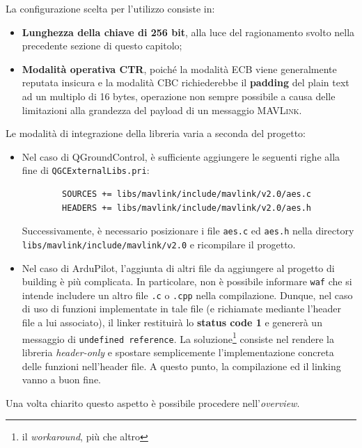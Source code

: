 \documentclass[a4paper, 12pt, oneside]{article}
\theoremstyle{definition}
\begin{document}
La configurazione scelta per l'utilizzo consiste in:

\begin{itemize}
    \item \textbf{Lunghezza della chiave di 256 bit}, alla luce del ragionamento svolto nella precedente sezione di questo capitolo;
    \item \textbf{Modalità operativa CTR}, poiché la modalità ECB viene generalmente reputata insicura e la modalità CBC richiederebbe il \textbf{padding} del plain text ad un multiplo di 16 bytes, operazione non sempre possibile a causa delle limitazioni alla grandezza del payload di un messaggio \textsc{MAVLink}.
\end{itemize}

Le modalità di integrazione della libreria varia a seconda del progetto:

\begin{itemize}
    \item Nel caso di QGroundControl, è sufficiente aggiungere le seguenti righe alla fine di \texttt{\texttt{QGCExternalLibs.pri}}:

    \begin{verbatim}
        SOURCES += libs/mavlink/include/mavlink/v2.0/aes.c
        HEADERS += libs/mavlink/include/mavlink/v2.0/aes.h
    \end{verbatim}

    Successivamente, è necessario posizionare i file \texttt{aes.c} ed \texttt{aes.h} nella directory \texttt{libs/mavlink/include/mavlink/v2.0} e ricompilare il progetto.
    \item Nel caso di ArduPilot, l'aggiunta di altri file da aggiungere al progetto di building è più complicata. 
    In particolare, non è possibile informare \texttt{waf} che si intende includere un altro file \texttt{.c} o \texttt{.cpp} nella compilazione. Dunque, nel caso di uso di funzioni implementate in tale file (e richiamate mediante l'header file a lui associato), il linker restituirà lo \textbf{status code 1} e genererà un messaggio di \texttt{undefined reference}. 
    La soluzione\footnote{il \textit{workaround}, più che altro} consiste nel rendere la libreria \textit{header-only} e spostare semplicemente l'implementazione concreta delle funzioni nell'header file. A questo punto, la compilazione ed il linking vanno a buon fine.
\end{itemize}

Una volta chiarito questo aspetto è possibile procedere nell'\textit{overview}.
\end{document}
